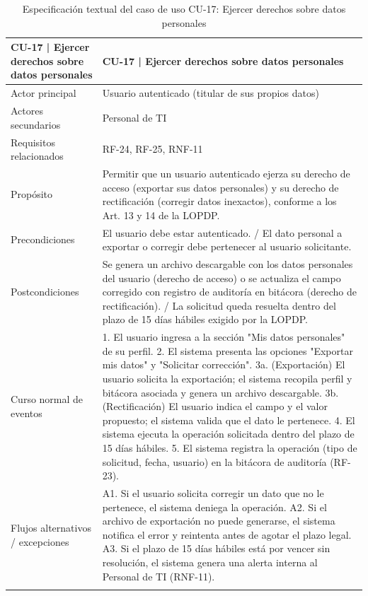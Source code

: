 %

\begingroup
\small
\begin{longtable}{|p{7.8cm}|p{7.8cm}|}
\hline
CU-17 | Ejercer derechos sobre datos personales & CU-17 | Ejercer derechos sobre datos personales \\ \hline
Actor principal & Usuario autenticado (titular de sus propios datos) \\ \hline
Actores secundarios & Personal de TI \\ \hline
Requisitos relacionados & RF-24, RF-25, RNF-11 \\ \hline
Propósito & Permitir que un usuario autenticado ejerza su derecho de acceso (exportar sus datos personales) y su derecho de rectificación (corregir datos inexactos), conforme a los Art. 13 y 14 de la LOPDP. \\ \hline
Precondiciones & El usuario debe estar autenticado. / El dato personal a exportar o corregir debe pertenecer al usuario solicitante. \\ \hline
Postcondiciones & Se genera un archivo descargable con los datos personales del usuario (derecho de acceso) o se actualiza el campo corregido con registro de auditoría en bitácora (derecho de rectificación). / La solicitud queda resuelta dentro del plazo de 15 días hábiles exigido por la LOPDP. \\ \hline
Curso normal de eventos & 1. El usuario ingresa a la sección "Mis datos personales" de su perfil. 2. El sistema presenta las opciones "Exportar mis datos" y "Solicitar corrección". 3a. (Exportación) El usuario solicita la exportación; el sistema recopila perfil y bitácora asociada y genera un archivo descargable. 3b. (Rectificación) El usuario indica el campo y el valor propuesto; el sistema valida que el dato le pertenece. 4. El sistema ejecuta la operación solicitada dentro del plazo de 15 días hábiles. 5. El sistema registra la operación (tipo de solicitud, fecha, usuario) en la bitácora de auditoría (RF-23). \\ \hline
Flujos alternativos / excepciones & A1. Si el usuario solicita corregir un dato que no le pertenece, el sistema deniega la operación. A2. Si el archivo de exportación no puede generarse, el sistema notifica el error y reintenta antes de agotar el plazo legal. A3. Si el plazo de 15 días hábiles está por vencer sin resolución, el sistema genera una alerta interna al Personal de TI (RNF-11). \\ \hline
\caption{Especificación textual del caso de uso CU-17: Ejercer derechos sobre datos personales}
\end{longtable}
\endgroup
